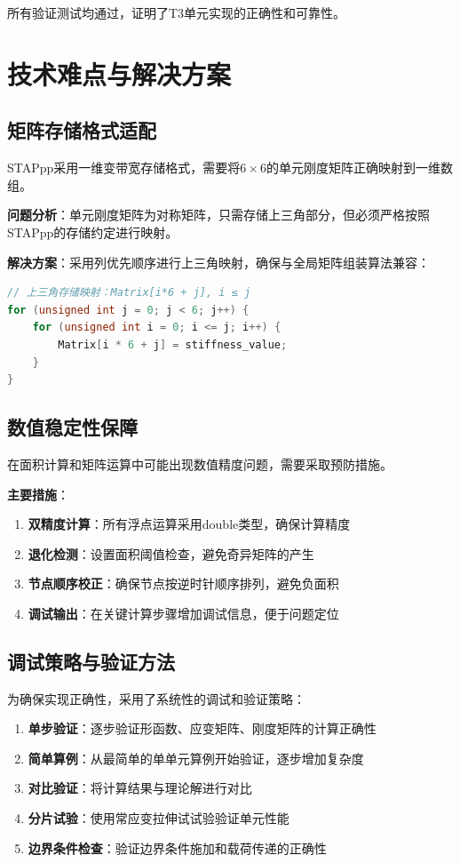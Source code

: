 \documentclass[12pt,a4paper]{article}
\begin{document}
所有验证测试均通过，证明了T3单元实现的正确性和可靠性。

\section{技术难点与解决方案}

\subsection{矩阵存储格式适配}

STAPpp采用一维变带宽存储格式，需要将$6 \times 6$的单元刚度矩阵正确映射到一维数组。

\textbf{问题分析}：单元刚度矩阵为对称矩阵，只需存储上三角部分，但必须严格按照STAPpp的存储约定进行映射。

\textbf{解决方案}：采用列优先顺序进行上三角映射，确保与全局矩阵组装算法兼容：

\begin{lstlisting}[language=C++]
// 上三角存储映射：Matrix[i*6 + j], i ≤ j
for (unsigned int j = 0; j < 6; j++) {
    for (unsigned int i = 0; i <= j; i++) {
        Matrix[i * 6 + j] = stiffness_value;
    }
}
\end{lstlisting}

\subsection{数值稳定性保障}

在面积计算和矩阵运算中可能出现数值精度问题，需要采取预防措施。

\textbf{主要措施}：
\begin{enumerate}
    \item \textbf{双精度计算}：所有浮点运算采用double类型，确保计算精度
    \item \textbf{退化检测}：设置面积阈值检查，避免奇异矩阵的产生
    \item \textbf{节点顺序校正}：确保节点按逆时针顺序排列，避免负面积
    \item \textbf{调试输出}：在关键计算步骤增加调试信息，便于问题定位
\end{enumerate}

\subsection{调试策略与验证方法}

为确保实现正确性，采用了系统性的调试和验证策略：

\begin{enumerate}
    \item \textbf{单步验证}：逐步验证形函数、应变矩阵、刚度矩阵的计算正确性
    \item \textbf{简单算例}：从最简单的单单元算例开始验证，逐步增加复杂度
    \item \textbf{对比验证}：将计算结果与理论解进行对比
    \item \textbf{分片试验}：使用常应变拉伸试试验验证单元性能
    \item \textbf{边界条件检查}：验证边界条件施加和载荷传递的正确性
\end{enumerate}
\end{document}
